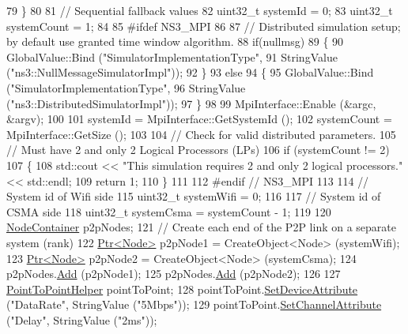 \begin{DoxyCode}
79     \}
80 
81   \textcolor{comment}{// Sequential fallback values}
82   uint32\_t systemId = 0;
83   uint32\_t systemCount = 1;
84 
85 \textcolor{preprocessor}{#ifdef NS3\_MPI}
86 
87   \textcolor{comment}{// Distributed simulation setup; by default use granted time window algorithm.}
88   \textcolor{keywordflow}{if}(nullmsg) 
89     \{
90       GlobalValue::Bind (\textcolor{stringliteral}{"SimulatorImplementationType"},
91                          StringValue (\textcolor{stringliteral}{"ns3::NullMessageSimulatorImpl"}));
92     \} 
93   \textcolor{keywordflow}{else} 
94     \{
95       GlobalValue::Bind (\textcolor{stringliteral}{"SimulatorImplementationType"},
96                          StringValue (\textcolor{stringliteral}{"ns3::DistributedSimulatorImpl"}));
97     \}
98 
99   MpiInterface::Enable (&argc, &argv);
100 
101   systemId = MpiInterface::GetSystemId ();
102   systemCount = MpiInterface::GetSize ();
103 
104   \textcolor{comment}{// Check for valid distributed parameters.}
105   \textcolor{comment}{// Must have 2 and only 2 Logical Processors (LPs)}
106   \textcolor{keywordflow}{if} (systemCount != 2)
107     \{
108       std::cout << \textcolor{stringliteral}{"This simulation requires 2 and only 2 logical processors."} << std::endl;
109       \textcolor{keywordflow}{return} 1;
110     \}
111 
112 \textcolor{preprocessor}{#endif // NS3\_MPI}
113 
114   \textcolor{comment}{// System id of Wifi side}
115   uint32\_t systemWifi = 0;
116   
117   \textcolor{comment}{// System id of CSMA side}
118   uint32\_t systemCsma = systemCount - 1;
119   
120   \hyperlink{classns3_1_1NodeContainer}{NodeContainer} p2pNodes;
121   \textcolor{comment}{// Create each end of the P2P link on a separate system (rank)}
122   \hyperlink{classns3_1_1Ptr}{Ptr<Node>} p2pNode1 = CreateObject<Node> (systemWifi);
123   \hyperlink{classns3_1_1Ptr}{Ptr<Node>} p2pNode2 = CreateObject<Node> (systemCsma);
124   p2pNodes.\hyperlink{classns3_1_1NodeContainer_aa60b3a0e70f2fb324e16ffcf8bf31fcb}{Add} (p2pNode1);
125   p2pNodes.\hyperlink{classns3_1_1NodeContainer_aa60b3a0e70f2fb324e16ffcf8bf31fcb}{Add} (p2pNode2);
126 
127   \hyperlink{classns3_1_1PointToPointHelper}{PointToPointHelper} pointToPoint;
128   pointToPoint.\hyperlink{classns3_1_1PointToPointHelper_a4577f5ab8c387e5528af2e0fbab1152e}{SetDeviceAttribute} (\textcolor{stringliteral}{"DataRate"}, StringValue (\textcolor{stringliteral}{"5Mbps"}));
129   pointToPoint.\hyperlink{classns3_1_1PointToPointHelper_a6b5317fd17fb61e5a53f8d66a90b63b9}{SetChannelAttribute} (\textcolor{stringliteral}{"Delay"}, StringValue (\textcolor{stringliteral}{"2ms"}));

\end{DoxyCode}
